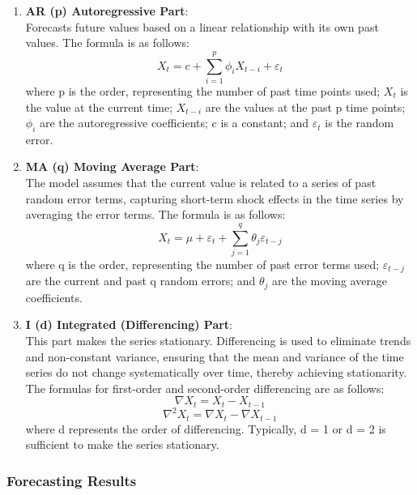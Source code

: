 \documentclass{article}
\begin{document}
	\begin{enumerate}[label=(\arabic*)]
		\item \textbf{AR (p) Autoregressive Part}: \\
		Forecasts future values based on a linear relationship with its own past values. The formula is as follows:
		\begin{equation}
			X_t = c + \sum_{i=1}^{p} \phi_i X_{t-i} + \varepsilon_t 
		\end{equation}
		where p is the order, representing the number of past time points used; \(X_t\) is the value at the current time; \(X_{t-i}\) are the values at the past p time points; \(\phi_i\) are the autoregressive coefficients; c is a constant; and \(\varepsilon_t\) is the random error.
		
		\item \textbf{MA (q) Moving Average Part}: \\
		The model assumes that the current value is related to a series of past random error terms, capturing short-term shock effects in the time series by averaging the error terms. The formula is as follows:
		\begin{equation}
			X_t = \mu + \varepsilon_t + \sum_{j=1}^{q} \theta_j \varepsilon_{t-j} 
		\end{equation}
		where q is the order, representing the number of past error terms used; \(\varepsilon_{t-j}\) are the current and past q random errors; and \(\theta_j\) are the moving average coefficients.
		
		\item \textbf{I (d) Integrated (Differencing) Part}: \\
		This part makes the series stationary. Differencing is used to eliminate trends and non-constant variance, ensuring that the mean and variance of the time series do not change systematically over time, thereby achieving stationarity. The formulas for first-order and second-order differencing are as follows:
		\begin{equation}
			\nabla X_t = X_t - X_{t-1} \tag{3}
		\end{equation}
		\begin{equation}
			\nabla^2 X_t = \nabla X_t - \nabla X_{t-1} \tag{4}
		\end{equation}
		where d represents the order of differencing. Typically, d = 1 or d = 2 is sufficient to make the series stationary.
	\end{enumerate}
	
	\subsubsection{Forecasting Results}
	
\end{document}
